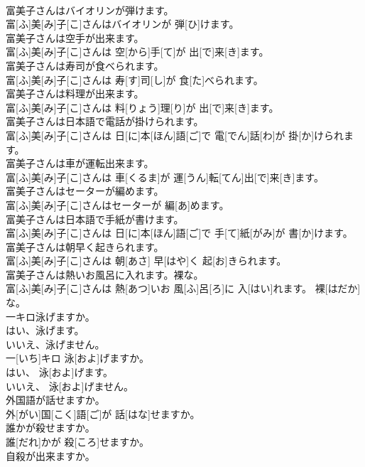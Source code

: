 \documentclass[8pt]{extreport}
\begin{document}
\begin{CJK}{UTF8}{min}
\\	富美子さんはバイオリンが弾けます。	
\\	富[ふ]美[み]子[こ]さんはバイオリンが 弾[ひ]けます。
\\	富美子さんは空手が出来ます。	
\\	富[ふ]美[み]子[こ]さんは 空[から]手[て]が 出[で]来[き]ます。
\\	富美子さんは寿司が食べられます。	
\\	富[ふ]美[み]子[こ]さんは 寿[す]司[し]が 食[た]べられます。
\\	富美子さんは料理が出来ます。	
\\	富[ふ]美[み]子[こ]さんは 料[りょう]理[り]が 出[で]来[き]ます。
\\	富美子さんは日本語で電話が掛けられます。	
\\	富[ふ]美[み]子[こ]さんは 日[に]本[ほん]語[ご]で 電[でん]話[わ]が 掛[か]けられます。
\\	富美子さんは車が運転出来ます。	
\\	富[ふ]美[み]子[こ]さんは 車[くるま]が 運[うん]転[てん]出[で]来[き]ます。
\\	富美子さんはセーターが編めます。	
\\	富[ふ]美[み]子[こ]さんはセーターが 編[あ]めます。
\\	富美子さんは日本語で手紙が書けます。	
\\	富[ふ]美[み]子[こ]さんは 日[に]本[ほん]語[ご]で 手[て]紙[がみ]が 書[か]けます。
\\	富美子さんは朝早く起きられます。	
\\	富[ふ]美[み]子[こ]さんは 朝[あさ] 早[はや]く 起[お]きられます。
\\	富美子さんは熱いお風呂に入れます。裸な。	
\\	富[ふ]美[み]子[こ]さんは 熱[あつ]いお 風[ふ]呂[ろ]に 入[はい]れます。 裸[はだか]な。
\\	一キロ泳げますか。 
\\	はい、泳げます。 
\\	いいえ、泳げません。	
\\	一[いち]キロ 泳[およ]げますか。 
\\	はい、 泳[およ]げます。 
\\	いいえ、 泳[およ]げません。
\\	外国語が話せますか。	
\\	外[がい]国[こく]語[ご]が 話[はな]せますか。
\\	誰かが殺せますか。	
\\	誰[だれ]かが 殺[ころ]せますか。
\\	自殺が出来ますか。	

\end{CJK}
\end{document}
